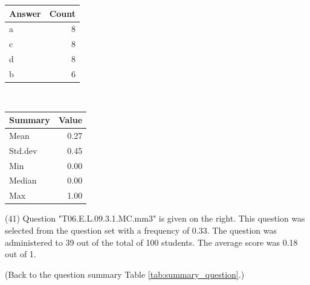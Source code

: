 \documentclass[12pt,nohyper]{tufte-handout}\usepackage[]{graphicx}\usepackage[]{color}
\begin{document}
\begin{center}%
\begin{tabular}{lr}
  \hline
Answer & Count \\ 
  \hline
a &   8 \\ 
  c &   8 \\ 
  d &   8 \\ 
  b &   6 \\ 
   \hline
\end{tabular}
~~~~~~~~%
\begin{tabular}{lr}
  \hline
Summary & Value \\ 
  \hline
Mean & 0.27 \\ 
  Std.dev & 0.45 \\ 
  Min & 0.00 \\ 
  Median & 0.00 \\ 
  Max & 1.00 \\ 
   \hline
\end{tabular}
\end{center}\newpage{} (41) Question "T06.E.L.09.3.1.MC.mm3" is given on the right. This question was selected from the question set with a frequency of 0.33. The question was administered to 39 out of the total of 100 students. The average score was 0.18 out of 1.

 (Back to the question summary Table \ref{tab:summary_question}.)
\end{document}
